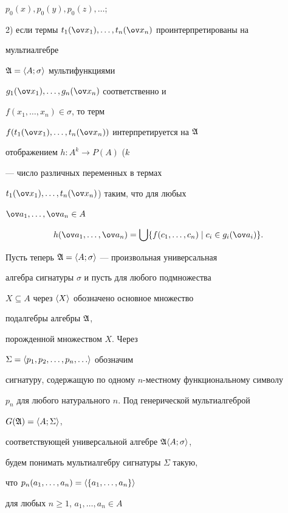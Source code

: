 $p_0(x),p_0(y),p_0(z),\dotsc$; 


 


2) если термы $t_1(\ov x_1),\dotsc,t_n(\ov x_n)$ проинтерпретированы на 


мультиалгебре 


$\frak A=\langle A;\sigma\rangle$ мультифункциями 


$g_1(\ov x_1),\dotsc,g_n(\ov x_n)$ соответственно и 


$f(x_1,\dotsc,x_n)\in\sigma$, то терм 


$f(t_1(\ov x_1),\dotsc,t_n(\ov x_n))$ интерпретируется на $\frak A$ 


отображением $h:A^k\to P(A)$ ($k$ 


--- число различных переменных в термах 


$t_1(\ov x_1),\dotsc,t_n(\ov x_n)$) таким, что для любых 


$\ov a_1,\dotsc,\ov a_n\in A$ 


$$ 


h(\ov a_1,\dotsc,\ov a_n)=\bigcup\{f(c_1,\dotsc,c_n)\mid 


c_i\in g_i(\ov a_i)\}. 


$$ 


 


Пусть теперь $\frak A=\langle A;\sigma\rangle$ --- произвольная универсальная 


алгебра сигнатуры $\sigma$ и пусть для любого подмножества 


$X\subseteq A$ через $\langle X\rangle$ обозначено основное множество 


подалгебры алгебры $\frak A$, 


порожденной множеством $X$. Через 


$\Sigma=\la p_1,p_2,\dotsc,p_n,\dotsc\ra$ обозначим 


сигнатуру, содержащую по одному $n$-местному функциональному символу 


$p_n$ для любого натурального $n$. Под генерической мультиалгеброй 


$G(\frak A)=\langle A;\Sigma\rangle$,


соответствующей универсальной алгебре $\frak A\langle A;\sigma\rangle$, 


будем понимать мультиалгебру сигнатуры $\Sigma$ такую, 


что $p_n(a_1,\dotsc,a_n)=\langle\{a_1,\dotsc,a_n\}\rangle$ 


для любых $n\ge 1$, $a_1,\dotsc,a_n\in A$ 


